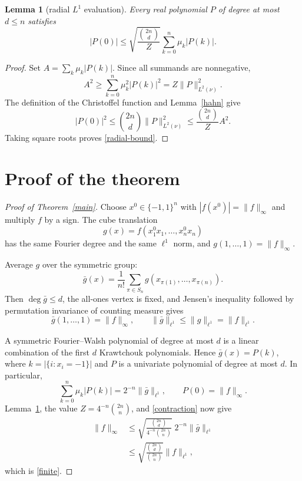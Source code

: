 \documentclass[11pt]{article}
\newtheorem{lemma}[theorem]{Lemma}
\newcommand{\Q}{\{-1,1\}}
\begin{document}
\begin{lemma}[radial $L^1$ evaluation]\label{radial}
Every real polynomial $P$ of degree at most $d\le n$ satisfies
\begin{equation}\label{radial-bound}
 |P(0)|\le
 \sqrt{\frac{\binom{2n}{d}}{Z}}
 \sum_{k=0}^n\mu_k|P(k)|.
\end{equation}
\end{lemma}

\begin{proof}
Set $A=\sum_k\mu_k|P(k)|$.  Since all summands are nonnegative,
\[
 A^2\ge\sum_{k=0}^n\mu_k^2|P(k)|^2
 =Z\|P\|_{L^2(\nu)}^2.
\]
The definition of the Christoffel function and Lemma~\ref{hahn} give
\[
 |P(0)|^2\le\binom{2n}{d}\|P\|_{L^2(\nu)}^2
 \le\frac{\binom{2n}{d}}{Z}A^2.
\]
Taking square roots proves \eqref{radial-bound}.
\end{proof}

\section{Proof of the theorem}

\begin{proof}[Proof of Theorem~\ref{main}]
Choose $x^0\in\Q^n$ with $|f(x^0)|=\|f\|_\infty$ and multiply $f$ by a
sign.  The cube translation
\[
 g(x)=f(x^0_1x_1,\ldots,x^0_nx_n)
\]
has the same Fourier degree and the same $\ell^1$ norm, and
$g(1,\ldots,1)=\|f\|_\infty$.

Average $g$ over the symmetric group:
\[
 \bar g(x)=\frac1{n!}\sum_{\pi\in S_n}
 g(x_{\pi(1)},\ldots,x_{\pi(n)}).
\]
Then $\deg\bar g\le d$, the all-ones vertex is fixed, and Jensen's
inequality followed by permutation invariance of counting measure gives
\begin{equation}\label{contraction}
 \bar g(1,\ldots,1)=\|f\|_\infty,
 \qquad
 \|\bar g\|_{\ell^1}\le\|g\|_{\ell^1}=\|f\|_{\ell^1}.
\end{equation}

A symmetric Fourier--Walsh polynomial of degree at most $d$ is a linear
combination of the first $d$ Krawtchouk polynomials.  Hence
$\bar g(x)=P(k)$, where $k=|\{i:x_i=-1\}|$ and $P$ is a univariate
polynomial of degree at most $d$.  In particular,
\[
 \sum_{k=0}^n\mu_k|P(k)|
 =2^{-n}\|\bar g\|_{\ell^1},
 \qquad P(0)=\|f\|_\infty.
\]
Lemma~\ref{radial}, the value
$Z=4^{-n}\binom{2n}{n}$, and \eqref{contraction} now give
\begin{align*}
 \|f\|_\infty
 &\le
 \sqrt{\frac{\binom{2n}{d}}
 {4^{-n}\binom{2n}{n}}}\;2^{-n}
 \|\bar g\|_{\ell^1}\\
 &\le
 \sqrt{\frac{\binom{2n}{d}}{\binom{2n}{n}}}
 \|f\|_{\ell^1},
\end{align*}
which is \eqref{finite}.
\end{proof}
\end{document}
